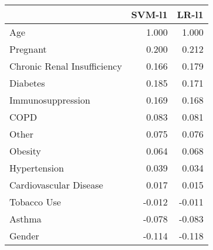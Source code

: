 \begin{tabular}{lrr}
\toprule
{} &  SVM-l1 &  LR-l1 \\
\midrule
Age                         &   1.000 &  1.000 \\
Pregnant                    &   0.200 &  0.212 \\
Chronic Renal Insufficiency &   0.166 &  0.179 \\
Diabetes                    &   0.185 &  0.171 \\
Immunosuppression           &   0.169 &  0.168 \\
COPD                        &   0.083 &  0.081 \\
Other                       &   0.075 &  0.076 \\
Obesity                     &   0.064 &  0.068 \\
Hypertension                &   0.039 &  0.034 \\
Cardiovascular Disease      &   0.017 &  0.015 \\
Tobacco Use                 &  -0.012 & -0.011 \\
Asthma                      &  -0.078 & -0.083 \\
Gender                      &  -0.114 & -0.118 \\
\bottomrule
\end{tabular}
